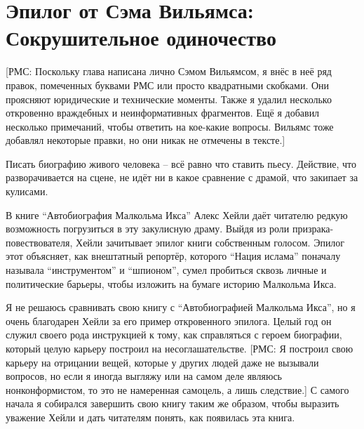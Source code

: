 

\chapter{Эпилог от Сэма Вильямса: Сокрушительное одиночество}

[РМС: Поскольку глава написана лично Сэмом Вильямсом, я внёс в неё ряд правок, помеченных буквами РМС или просто квадратными скобками. Они проясняют юридические и технические моменты. Также я удалил несколько откровенно враждебных и неинформативных фрагментов. Ещё я добавил несколько примечаний, чтобы ответить на кое-какие вопросы. Вильямс тоже добавлял некоторые правки, но они никак не отмечены в тексте.]

Писать биографию живого человека -- всё равно что ставить пьесу. Действие, что разворачивается на сцене, не идёт ни в какое сравнение с драмой, что закипает за кулисами.

В книге \enquote{Автобиография Малкольма Икса} Алекс Хейли даёт читателю редкую возможность погрузиться в эту закулисную драму. Выйдя из роли призрака-повествователя, Хейли зачитывает эпилог книги собственным голосом. Эпилог этот объясняет, как внештатный репортёр, которого \enquote{Нация ислама} поначалу называла \enquote{инструментом} и \enquote{шпионом}, сумел пробиться сквозь личные и политические барьеры, чтобы изложить на бумаге историю Малкольма Икса.

Я не решаюсь сравнивать свою книгу с \enquote{Автобиографией Малкольма Икса}, но я очень благодарен Хейли за его пример откровенного эпилога. Целый год он служил своего рода инструкцией к тому, как справляться с героем биографии, который целую карьеру построил на несоглашательстве. [РМС: Я построил свою карьеру на отрицании вещей, которые у других людей даже не вызывали вопросов, но если я иногда выгляжу или на самом деле являюсь нонконформистом, то это не намеренная самоцель, а лишь следствие.] С самого начала я собирался завершить свою книгу таким же образом, чтобы выразить уважение Хейли и дать читателям понять, как появилась эта книга.

